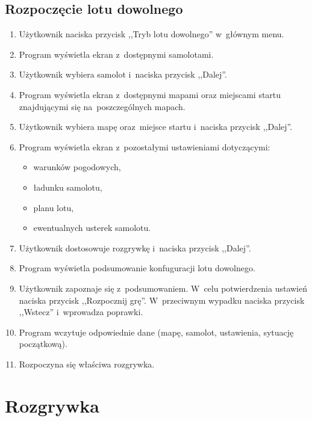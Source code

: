 \documentclass{mwrep}
\begin{document}
\section{Rozpoczęcie lotu dowolnego}
\begin{enumerate}
  \item Użytkownik naciska przycisk ,,Tryb lotu dowolnego'' w~głównym \linebreak menu.
  \item Program wyświetla ekran z~dostępnymi samolotami.
  \item Użytkownik wybiera samolot i~naciska przycisk ,,Dalej''.
  \item Program wyświetla ekran z~dostępnymi mapami oraz miejscami \linebreak startu znajdującymi się na~poszczególnych mapach.
  \item Użytkownik wybiera mapę oraz~miejsce startu i~naciska przycisk ,,Dalej''.
  \item Program wyświetla ekran z~pozostałymi ustawieniami dotyczącymi:
  \begin{itemize}
    \item warunków pogodowych,
    \item ładunku samolotu,
    \item planu lotu,
    \item ewentualnych usterek samolotu.
  \end{itemize}
  \item Użytkownik dostosowuje rozgrywkę i~naciska przycisk ,,Dalej''.
  \item Program wyświetla podsumowanie konfuguracji lotu dowolnego.
  \item Użytkownik zapoznaje się z~podsumowaniem. W~celu potwierdzenia ustawień naciska przycisk ,,Rozpocznij grę''. W~przeciwnym wypadku naciska przycisk ,,Wstecz'' i~wprowadza poprawki.
  \item Program wczytuje odpowiednie dane (mapę, samolot, ustawienia, sytuację początkową).
  \item Rozpoczyna się właściwa rozgrywka.
\end{enumerate}

\chapter{Rozgrywka}
\end{document}
